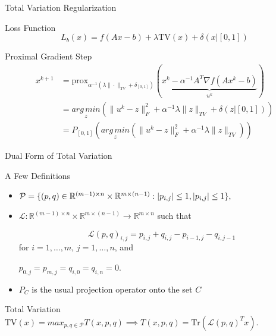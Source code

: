 \documentclass[12pt]{beamer}
\DeclarePairedDelimiter{\abs}{\lvert}{\rvert}
\newcommand{\R}{\mathbb{R}}
\newcommand{\AMz}{\underset{z}{arg\, min}}
\newcommand{\prox}{\text{prox}}
\begin{document}
\begin{frame}{Total Variation Regularization}

\begin{exampleblock}{Loss Function}
$$
L_b(x) = f(Ax-b) + \lambda \mathrm{TV}(x) + \delta(x | [0,1])
$$
\end{exampleblock}

\begin{exampleblock}{Proximal Gradient Step}
\begin{align*}
x^{k+1} &= \prox_{\alpha^{-1}(\lambda \|\cdot \|_{TV} + \delta_{[0,1]})} (\underbrace{x^k - \alpha^{-1} A^T\nabla f (Ax^k - b)}_{u^k}) \\
&= \AMz \left( \|u^k - z\|_F^2 + \alpha^{-1}\lambda \|z\|_{TV} + \delta(z | [0,1]) \right) \\
&= P_{[0,1]}  \left( \AMz \left( \|u^k - z\|_F^2 + \alpha^{-1}\lambda \|z\|_{TV} \right) \right)
\end{align*}
\end{exampleblock}

\end{frame}

\begin{frame}{Dual Form of Total Variation}

\begin{exampleblock}{A Few Definitions}
\begin{itemize}

\item $\mathcal{P} = \{ (p,q) \in \R^{(m-1) \times n} \times \R^{ m \times (n-1) } :  \abs{p_{i,j} } \le 1, \abs{p_{ i,j } } \le 1 \},$

\item $ \mathcal{L} : \R^{(m-1) \times n} \times \R^{ m \times (n-1) } \rightarrow \R^{m \times n}$ such that

$$ \mathcal{L}(p,q)_{i,j} = p_{i,j} + q_{i,j} - p_{ i-1,j } - q_{ i,j-1 }$$ for $i = 1,\dots,m$, $j = 1,\dots,n$, and 

$ p_{0,j} = p_{m,j} = q_{i,0} = q_{i,n} = 0.$ 

\item $P_C$ is the usual projection operator onto the set $C$

\end{itemize}
\end{exampleblock}

\begin{exampleblock}{Total Variation}
$ \mathrm{TV}(x) = max_{p,q \in \mathcal{P}} T(x, p,q) \implies T(x,p,q) = \mathrm{Tr} ( \mathcal{L}(p,q)^T x ).$
\end{exampleblock}

\end{frame}
\end{document}
